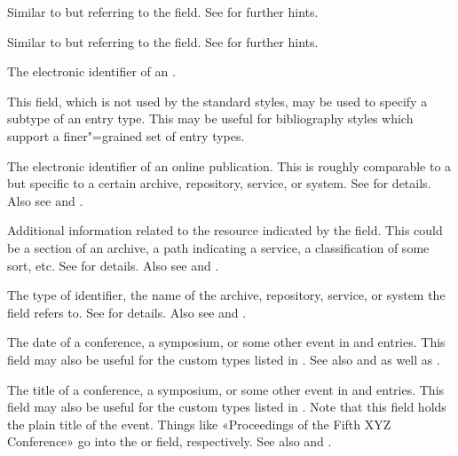 \documentclass{ltxdockit}[2011/03/25]
\begin{document}
\begin{fieldlist}

Similar to  but referring to the  field. See  for further hints.


Similar to  but referring to the  field. See  for further hints.


The electronic identifier of an .


This field, which is not used by the standard styles, may be used to specify a subtype of an entry type. This may be useful for bibliography styles which support a finer"=grained set of entry types.


The electronic identifier of an online publication. This is roughly comparable to a  but specific to a certain archive, repository, service, or system. See  for details. Also see  and .


Additional information related to the resource indicated by the  field. This could be a section of an archive, a path indicating a service, a classification of some sort, etc. See  for details. Also see  and .


The type of  identifier, \eg the name of the archive, repository, service, or system the  field refers to. See  for details. Also see  and .


The date of a conference, a symposium, or some other event in  and  entries. This field may also be useful for the custom types listed in . See also  and  as well as .


The title of a conference, a symposium, or some other event in  and  entries. This field may also be useful for the custom types listed in . Note that this field holds the plain title of the event. Things like «Proceedings of the Fifth XYZ Conference» go into the  or  field, respectively. See also  and .


\end{fieldlist}
\end{document}
